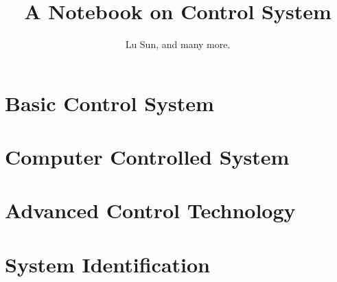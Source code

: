 

\makeindex



\frontmatter

\title{A Notebook on Control System}
\author{Lu Sun, and many more.}

\maketitle


\tableofcontents


\listoffigures
\listoftables

\mainmatter

\part{Basic Control System}





\part{Computer Controlled System}





\part{Advanced Control Technology}









\part{System Identification}





